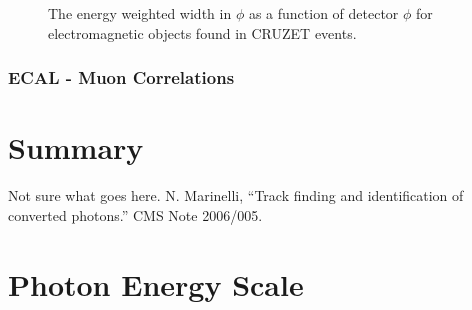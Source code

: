 \documentclass{cmspaper}
\begin{document}
\begin{figure}[hbtp]
  \begin{center}
    \caption{The energy weighted width in $\phi$ as a function of detector $\phi$ for electromagnetic objects found in
CRUZET events.}
    \label{fig:CRUZETPhiWidPhi}
  \end{center}
\end{figure}

\subsubsection{ECAL - Muon Correlations}


\section{Summary}

\begin{thebibliography}{9}
  Not sure what goes here.
  N. Marinelli, ``Track finding and identification of converted photons.''  CMS Note 2006/005.


\end{thebibliography}
 
\pagebreak
\appendix
\section{Photon Energy Scale}
\end{document}
